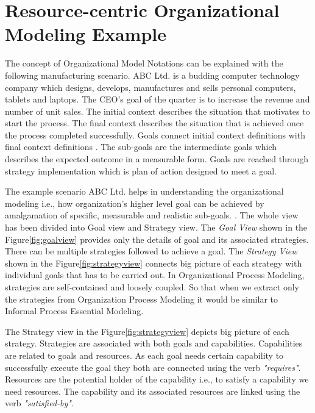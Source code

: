 \section{Resource-centric Organizational Modeling Example}
\label{sec:scenario}
 The concept of Organizational Model Notations can be explained with the following manufacturing scenario. ABC Ltd. is a budding computer technology company which designs, develops, manufactures and sells personal computers, tablets and laptops. The CEO's goal of the quarter is to increase the revenue and number of unit sales. The initial context describes the situation that motivates to start the process. The final context describes the situation that is achieved once the process completed successfully. Goals connect initial context definitions with final context definitions \cite{Sungur2014a}. The sub-goals are the intermediate goals which describes the expected outcome in a measurable form. Goals are reached through strategy implementation which is plan of action designed to meet a goal. 

 The example scenario ABC Ltd. helps in understanding the organizational modeling i.e., how organization's higher level goal can be achieved by amalgamation of specific, measurable and realistic sub-goals. . The whole view has been divided into Goal view and Strategy view. The \textit{Goal View} shown in the Figure\ref{fig:goalview} provides only the details of goal and its associated strategies. There can be multiple strategies followed to achieve a goal. The \textit{Strategy View} shown in the Figure\ref{fig:strategyview} connects big picture of each strategy with individual goals that has to be carried out. In Organizational Process Modeling, strategies are self-contained and loosely coupled. So that when we extract only the strategies from Organization Process Modeling it would be similar to Informal Process Essential Modeling. 

 The Strategy view  in the Figure\ref{fig:strategyview} depicts big picture of each strategy. Strategies are associated with both goals and capabilities. Capabilities are related to goals and resources. As each goal needs certain capability to successfully execute the goal they both are connected using the verb \textit{"requires"}. Resources are the potential holder of the capability i.e., to satisfy a capability we need resources. The capability and its associated resources are linked using the verb \textit{"satisfied-by"}. 


